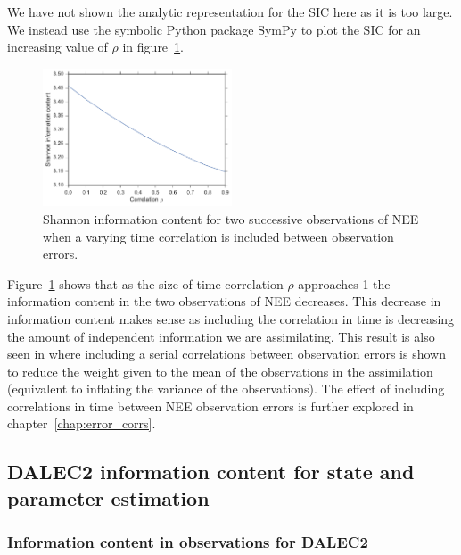 We have not shown the analytic representation for the SIC here as it is too large. We instead use the symbolic Python package SymPy \citep{Joyner:2012:OSC:2110170.2110185} to plot the SIC for an increasing value of \(\rho\) in figure~\ref{chap5:fig:sic_corr_D1}.
\begin{figure}[ht]
	\centering
        \includegraphics[width=0.5\textwidth]{chapter/chapter5/sic_corr_D1_nee.pdf}
    \caption{Shannon information content for two successive observations of NEE when a varying time correlation is included between observation errors.}
    \label{chap5:fig:sic_corr_D1}
\end{figure}
Figure~\ref{chap5:fig:sic_corr_D1} shows that as the size of time correlation \(\rho\) approaches 1 the information content in the two observations of NEE decreases. This decrease in information content makes sense as including the correlation in time is decreasing the amount of independent information we are assimilating. This result is also seen in \citet{jarvinen1999variational} where including a serial correlations between observation errors is shown to reduce the weight given to the mean of the observations in the assimilation (equivalent to inflating the variance of the observations). The effect of including correlations in time between NEE observation errors is further explored in chapter~\ref{chap:error_corrs}.

\subsection{DALEC2 information content for state and parameter estimation} \label{chap5:sec:D2_IC}%
\subsubsection{Information content in observations for DALEC2}

